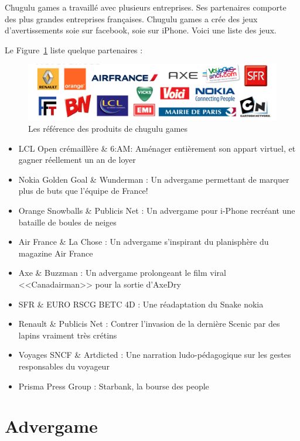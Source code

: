 Chugulu games a travaillé avec plusieurs entreprises. Ses partenaires comporte des plus grandes entreprises françaises. Chugulu games a crée des jeux d'avertissements soie sur facebook, soie sur iPhone. Voici une liste des jeux.

Le Figure~\ref{fig:Image_chugulu_reference} liste quelque partenaires : 


\begin{figure}[htbp]
	\centering
		\includegraphics[width=6in]{Image/chugulu_reference.png}
	\caption{Les référence des produits de chugulu games}
	\label{fig:Image_chugulu_reference}
\end{figure}


\begin{itemize}
	\item LCL Open crémaillère \& 6:AM: Aménager entièrement son appart virtuel, et gagner réellement un an de loyer 
	\item Nokia Golden Goal \& Wunderman : Un advergame permettant de marquer plus de buts que l'équipe de France!
	\item Orange Snowballs \& Publicis Net : Un advergame pour i-Phone recréant une bataille de boules de neiges
	\item Air France \& La Chose : Un advergame s'inspirant du planisphère du magazine Air France
	\item Axe \& Buzzman : Un advergame prolongeant le film viral <<Canadairman>> pour la sortie d'AxeDry
	\item SFR \& EURO RSCG BETC 4D : Une réadaptation du Snake nokia 
	\item Renault \& Publicis Net : Contrer l'invasion de la dernière Scenic par des lapins vraiment très crétins
	\item Voyages SNCF \& Artdicted : Une narration ludo-pédagogique sur les gestes responsables du voyageur
	\item Prisma Press Group : Starbank, la bourse des people 
\end{itemize}


\section{Advergame} %
\label{sub:advergame}

